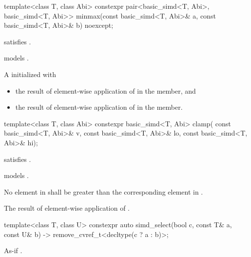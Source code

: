 \begin{itemdecl}
template<class T, class Abi>
  constexpr pair<basic_simd<T, Abi>, basic_simd<T, Abi>>
  minmax(const basic_simd<T, Abi>& a, const basic_simd<T, Abi>& b) noexcept;
\end{itemdecl}

\begin{itemdescr}
  \pnum\constraints
   satisfies .

  \pnum\expects
   models .

  \pnum\returns
  A  initialized with
  \begin{itemize}
    \item the result of element-wise application of  \foralli{} in the  member, and
    \item the result of element-wise application of  \foralli{} in the  member.
  \end{itemize}
\end{itemdescr}

\begin{itemdecl}
template<class T, class Abi>
  constexpr basic_simd<T, Abi> clamp(
    const basic_simd<T, Abi>& v, const basic_simd<T, Abi>& lo, const basic_simd<T, Abi>& hi);
\end{itemdecl}

\begin{itemdescr}
  \pnum\constraints
   satisfies .

  \pnum\expects
   models .

  \pnum\expects
  No element in  shall be greater than the corresponding element in .

  \pnum\returns
  The result of element-wise application of  \foralli.
\end{itemdescr}

\begin{itemdecl}
  template<class T, class U>
    constexpr auto simd_select(bool c, const T& a, const U& b)
    -> remove_cvref_t<decltype(c ? a : b)>;
\end{itemdecl}

\begin{itemdescr}
    \pnum\returns As-if .
\end{itemdescr}

